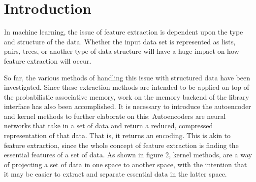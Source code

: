 \documentclass{sig-alternate}
\begin{document}



\section{Introduction}
\label{sec:intro}

In machine learning, the issue of feature extraction is dependent upon
the type and structure of the data. Whether the input data set is 
represented as lists, pairs, trees, or another type of data structure will 
have a huge impact on how feature extraction will occur. 

So far, the various methods of handling this issue with structured data have been investigated.
Since these extraction methods are intended to be applied on top of the probabilistic
associative memory, work on the memory backend of the library interface has also been accomplished.
It is necessary to introduce the autoencoder and kernel methods to further elaborate on this: 
Autoencoders are neural networks that take in a set of data and return a reduced, compressed representation of that
data. That is, it returns an encoding. This is akin to feature extraction, 
since the whole concept of feature extraction is finding the essential features 
of a set of data. As shown in figure 2, kernel methods, are a way of projecting
a set of data in one space to another space, with the intention that it may
be easier to extract and separate essential data in the latter space. 
\end{document}
